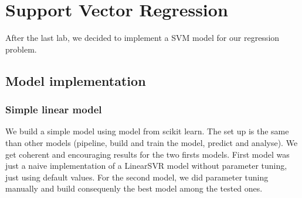 \section{Support Vector Regression}
After the last lab, we decided to implement a SVM model for our regression problem.

\subsection{Model implementation}
\subsubsection{Simple linear model}
We build a simple model using  model from scikit learn. The set up is the same than other models (pipeline, build and train the model, predict and analyse).
We get coherent and encouraging results for the two firsts models. First model was just a naive implementation of a LinearSVR model without parameter tuning, just using default values. For the second model, we did parameter tuning manually and build consequenly the best model among the tested ones.
